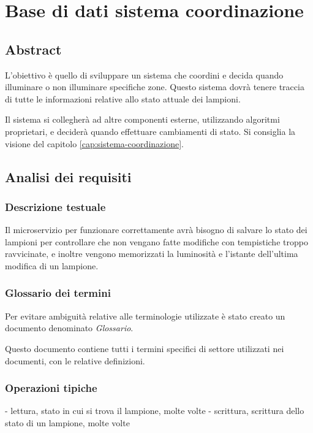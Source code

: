 \section{Base di dati sistema coordinazione}

\subsection{Abstract}

L'obiettivo è quello di sviluppare un sistema che coordini e decida quando illuminare o non illuminare specifiche zone. Questo sistema dovrà tenere traccia di tutte le informazioni relative allo stato attuale dei lampioni.

Il sistema si collegherà ad altre componenti esterne, utilizzando algoritmi proprietari, e deciderà quando effettuare cambiamenti di stato. Si consiglia la visione del capitolo \ref{cap:sistema-coordinazione}.

\subsection{Analisi dei requisiti}

\subsubsection{Descrizione testuale}

Il microservizio per funzionare correttamente avrà bisogno di salvare lo stato dei lampioni per controllare che non vengano fatte modifiche con tempistiche troppo ravvicinate, e inoltre vengono memorizzati la luminosità e l'istante dell'ultima modifica di un lampione. 

\subsubsection{Glossario dei termini}

Per evitare ambiguità relative alle terminologie utilizzate è stato creato un documento denominato \textit{Glossario}.

Questo documento contiene tutti i termini specifici di settore utilizzati nei documenti, con le relative definizioni.

\subsubsection{Operazioni tipiche}

- lettura, stato in cui si trova il lampione, molte volte
- scrittura, scrittura dello stato di un lampione, molte volte

